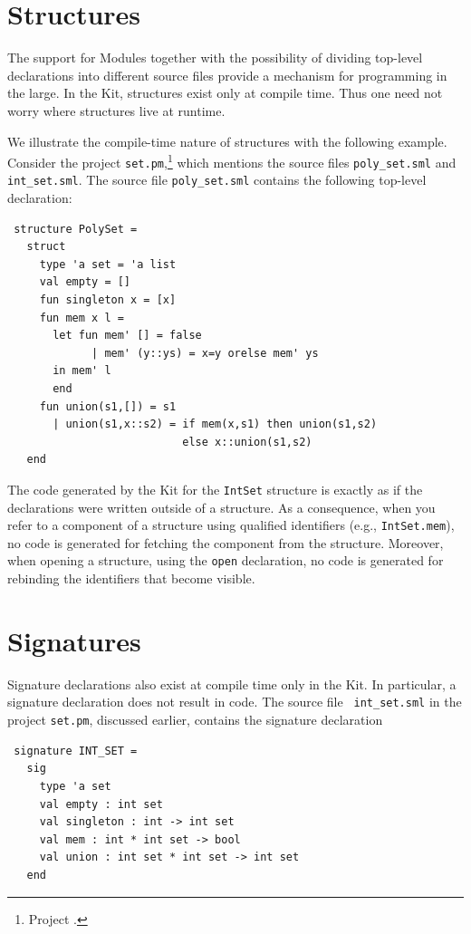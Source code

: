 \documentclass[12pt]{book}
\begin{document}
\section{Structures}
The support for Modules together with the possibility of dividing
top-level declarations into different source files provide a mechanism
for programming in the large. In the Kit, structures exist only at
compile time.  Thus one need not worry where
%
structures live at runtime.

We illustrate the compile-time nature of structures with the following
example. Consider the project {\tt set.pm},\footnote{Project
  .} which mentions the source files {\tt poly\_set.sml} and {\tt int\_set.sml}. The source
  file {\tt poly\_set.sml} contains the following top-level
  declaration:
\begin{verbatim}
 structure PolySet = 
   struct
     type 'a set = 'a list
     val empty = []
     fun singleton x = [x]
     fun mem x l = 
       let fun mem' [] = false
             | mem' (y::ys) = x=y orelse mem' ys 
       in mem' l
       end
     fun union(s1,[]) = s1
       | union(s1,x::s2) = if mem(x,s1) then union(s1,s2)
                           else x::union(s1,s2)  
   end
\end{verbatim}

\noindent
The code generated by the Kit for the {\tt IntSet} structure is
exactly as if the declarations were written outside of a structure.
As a consequence, when you refer to a component of a structure using
qualified identifiers (e.g., {\tt IntSet.mem}), no code is generated
for fetching the component from the structure. Moreover, when opening
a structure, using the {\tt open} declaration, no code is generated
for rebinding the identifiers that become visible.

\section{Signatures}
%
Signature declarations also exist at compile
time only in the Kit. In particular, a signature declaration does not
result in code. The source file {\tt
int\_set.sml} in the project {\tt set.pm}, discussed earlier, contains
the signature declaration
\begin{verbatim}
 signature INT_SET =
   sig
     type 'a set
     val empty : int set
     val singleton : int -> int set
     val mem : int * int set -> bool
     val union : int set * int set -> int set
   end
\end{verbatim}
\end{document}
